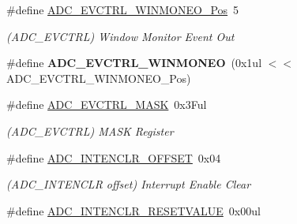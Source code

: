 \begin{DoxyCompactItemize}
\item 
\hypertarget{group___s_a_m_l21___a_d_c_gaee6cc66f7667c52d0f0166c26fb61ac5}{}\#define \hyperlink{group___s_a_m_l21___a_d_c_gaee6cc66f7667c52d0f0166c26fb61ac5}{A\+D\+C\+\_\+\+E\+V\+C\+T\+R\+L\+\_\+\+W\+I\+N\+M\+O\+N\+E\+O\+\_\+\+Pos}~5\label{group___s_a_m_l21___a_d_c_gaee6cc66f7667c52d0f0166c26fb61ac5}

\begin{DoxyCompactList}\small\item\em (A\+D\+C\+\_\+\+E\+V\+C\+T\+R\+L) Window Monitor Event Out \end{DoxyCompactList}\item 
\hypertarget{group___s_a_m_l21___a_d_c_ga61d3448a5930959057777b974313a0be}{}\#define {\bfseries A\+D\+C\+\_\+\+E\+V\+C\+T\+R\+L\+\_\+\+W\+I\+N\+M\+O\+N\+E\+O}~(0x1ul $<$$<$ A\+D\+C\+\_\+\+E\+V\+C\+T\+R\+L\+\_\+\+W\+I\+N\+M\+O\+N\+E\+O\+\_\+\+Pos)\label{group___s_a_m_l21___a_d_c_ga61d3448a5930959057777b974313a0be}

\item 
\hypertarget{group___s_a_m_l21___a_d_c_ga3163598754fcfe1101f38627982c882f}{}\#define \hyperlink{group___s_a_m_l21___a_d_c_ga3163598754fcfe1101f38627982c882f}{A\+D\+C\+\_\+\+E\+V\+C\+T\+R\+L\+\_\+\+M\+A\+S\+K}~0x3\+Ful\label{group___s_a_m_l21___a_d_c_ga3163598754fcfe1101f38627982c882f}

\begin{DoxyCompactList}\small\item\em (A\+D\+C\+\_\+\+E\+V\+C\+T\+R\+L) M\+A\+S\+K Register \end{DoxyCompactList}\item 
\hypertarget{group___s_a_m_l21___a_d_c_ga2ee30f1da1a9071d819e8ec44e4c33e3}{}\#define \hyperlink{group___s_a_m_l21___a_d_c_ga2ee30f1da1a9071d819e8ec44e4c33e3}{A\+D\+C\+\_\+\+I\+N\+T\+E\+N\+C\+L\+R\+\_\+\+O\+F\+F\+S\+E\+T}~0x04\label{group___s_a_m_l21___a_d_c_ga2ee30f1da1a9071d819e8ec44e4c33e3}

\begin{DoxyCompactList}\small\item\em (A\+D\+C\+\_\+\+I\+N\+T\+E\+N\+C\+L\+R offset) Interrupt Enable Clear \end{DoxyCompactList}\item 
\hypertarget{group___s_a_m_l21___a_d_c_gab16539d50c97ef7fd06085b36ef7c588}{}\#define \hyperlink{group___s_a_m_l21___a_d_c_gab16539d50c97ef7fd06085b36ef7c588}{A\+D\+C\+\_\+\+I\+N\+T\+E\+N\+C\+L\+R\+\_\+\+R\+E\+S\+E\+T\+V\+A\+L\+U\+E}~0x00ul\label{group___s_a_m_l21___a_d_c_gab16539d50c97ef7fd06085b36ef7c588}


\end{DoxyCompactItemize}
